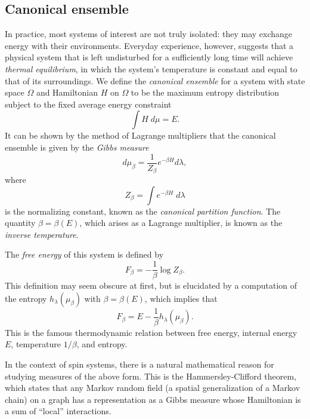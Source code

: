 
\subsection{Canonical ensemble}

In practice, most systems of interest are not truly isolated: they may exchange
energy with their environments. Everyday experience, however, suggests that
a physical system that is left undisturbed for a sufficiently long time will achieve
\emph{thermal equilibrium}, in which the system's temperature is constant and equal to
that of its surroundings. We define the \emph{canonical ensemble} for a system with
state space $\Omega$ and Hamiltonian $H$ on $\Omega$
to be the maximum entropy distribution subject to the fixed average energy constraint
\begin{equation}
\int H \; d\mu = E.
\end{equation}
It can be shown by the method of Lagrange multipliers that the canonical ensemble is
given by the \emph{Gibbs measure}
\begin{equation}
d\mu_\beta = \frac{1}{Z_\beta} e^{-\beta H} d\lambda,
\end{equation}
where
\begin{equation}
Z_\beta = \int e^{-\beta H} \; d\lambda
\end{equation}
is the normalizing constant, known as the \emph{canonical partition function}.
The quantity $\beta = \beta(E)$, which arises as a Lagrange multiplier, is known as
the \emph{inverse temperature}.

The \emph{free energy} of this system is defined by
\begin{equation}
F_\beta = -\frac{1}{\beta} \log Z_\beta.
\end{equation}
This definition may seem obscure at first, but is elucidated by
a computation of the entropy $h_\lambda(\mu_\beta)$ with $\beta = \beta(E)$, which implies that
\begin{equation}
F_\beta = E - \frac{1}{\beta} h_\lambda(\mu_\beta).
\end{equation}
This is the famous thermodynamic relation between free energy, internal energy $E$,
temperature $1/\beta$, and entropy.


In the context of spin systems, there is a natural mathematical reason for studying measures
of the above form. This is the Hammersley-Clifford theorem, which states that any Markov
random field (a spatial generalization of a Markov chain) on a graph has a representation
as a Gibbs measure whose Hamiltonian is a sum of ``local'' interactions.

